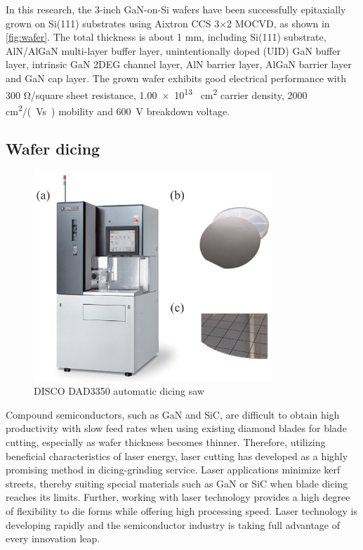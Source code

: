 In this research, the 3-inch GaN-on-Si wafers  have been successfully epitaxially grown on Si(111) substrates  using Aixtron CCS 3×2 MOCVD, as shown in \autoref{fig:wafer}. The total thickness is about 1 \unit{\mm}, including Si(111) substrate, AlN/AlGaN multi-layer buffer layer, unintentionally doped (UID) GaN buffer layer, intrinsic GaN  2DEG channel  layer, AlN barrier layer, AlGaN barrier layer and GaN cap layer. The grown wafer exhibits good electrical performance with 300 \unit{\ohm}/square sheet resistance, \num{1.00e13} \unit{\per\square\cm} carrier density, 2000 \unit{\square\cm/(Vs)} mobility  and \SI{600}{\volt} breakdown  voltage.

\subsection{Wafer dicing}

\begin{figure}[H] 
\centering    
\includegraphics[width=0.8\textwidth]{CUT}
\caption[DISCO DAD3350 automatic dicing saw]{DISCO DAD3350 automatic dicing saw}
\label{fig:CUT}
\end{figure}

Compound semiconductors, such as GaN and SiC, are difficult to obtain high productivity with slow feed rates when using existing diamond blades for blade cutting, especially as wafer thickness becomes thinner. Therefore, utilizing beneficial characteristics of laser energy, laser cutting has developed as a highly promising method in dicing-grinding  service. Laser applications minimize kerf streets, thereby suiting special materials such as GaN or SiC when blade dicing reaches its limits. Further, working with laser technology provides a high degree of flexibility to die forms while offering high processing speed. Laser technology is developing rapidly and the semiconductor industry is taking full advantage of every innovation leap.

